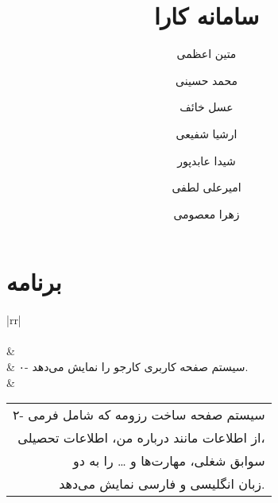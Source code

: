 \documentclass[12pt]{article}
\author{متین اعظمی}
\author{محمد حسینی}
\author{عسل خائف}
\author{ارشیا شفیعی}
\author{شیدا عابدپور}
\author{امیرعلی لطفی}
\author{زهرا معصومی}
\title{سامانه کارا}
\begin{document}
	
	\section{برنامه}
	\begin{table}[]
		\begin{tabular}{|rr|}
			\hline
			                                                                                                                                                                                                                                                                                           \\ \hline
			                                                                                                                                                                                                                                                                        \\ \hline
			                                                                                                             &                                                                                                                                                         \\ \hline
			                                                                                                                         & ۰- سیستم صفحه کاربری کارجو را نمایش می‌دهد.                                                                                                                                                             \\ \hline
			               & \begin{tabular}[c]{@{}r@{}}۲- سیستم صفحه ساخت رزومه که شامل فرمی \\ از اطلاعات مانند درباره من، اطلاعات تحصیلی، \\ سوابق شغلی، مهارت‌ها و … را به دو\\  زبان انگلیسی و فارسی نمایش می‌دهد.\end{tabular} \\ \hline

\end{tabular}
\end{table}
\end{document}
